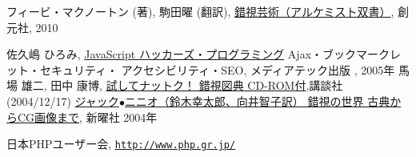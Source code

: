 \begin{thebibliography}{99}
 フィービ・マクノートン (著), 駒田曜 (翻訳),
				 \href{http://www.amazon.co.jp/%E9%8C%AF%E8%A6%96%E8%8A%B8%E8%A1%93%EF%BC%88%E3%82%A2%E3%83%AB%E3%82%B1%E3%83%9F%E3%82%B9%E3%83%88%E5%8F%8C%E6%9B%B8%EF%BC%89-%E3%83%95%E3%82%A3%E3%83%BC%E3%83%93%E3%83%BB%E3%83%9E%E3%82%AF%E3%83%8E%E3%83%BC%E3%83%88%E3%83%B3/dp/4422214802/ref=sr_1_42?s=books&ie=UTF8&qid=1457336858&sr=1-42&keywords=%E9%8C%AF%E8%A6%96}{錯視芸術（アルケミスト双書）},
				 創元社, 2010
\fi
\iffalse
 \bibitem{Ajax}深津 貴之、増井 雄一郎、川崎 有亮、台場 圭一、WINGSプロジェクト,\\
\href{http://www.amazon.co.jp/exec/obidos/ASIN/4774125792/qid=1149342810/sr=8-2/ref=sr_8_xs_ap_i2_xgl14/249-2928731-2660351}
{Ajax 実装のための基礎テクニック}、技術評論社、2006年
\fi
\ifSeminor
\else
 佐久嶋 ひろみ,
\href{http://www.amazon.co.jp/exec/obidos/search-handle-url/index=books-jp&field-keywords=javascript/ref=xs_ap_sai1_xgl14/249-2928731-2660351}{JavaScript
	ハッカーズ・プログラミング} Ajax・ブックマークレット・セキュリティ・
	アクセシビリティ・SEO, メディアテック出版 , 2005年
         \fi
馬場 雄二, 田中 康博,
\href{http://www.amazon.co.jp/%E8%A9%A6%E3%81%97%E3%81%A6%E3%83%8A%E3%83%83%E3%83%88%E3%82%AF%EF%BC%81-%E9%8C%AF%E8%A6%96%E5%9B%B3%E5%85%B8-CD-ROM%E4%BB%98-%E9%A6%AC%E5%A0%B4-%E9%9B%84%E4%BA%8C/dp/4062744082/sr=1-1/qid=1167376185/ref=sr_1_1/503-0729601-8062303?ie=UTF8&s=books}
{試してナットク！ 錯視図典 CD-ROM付},講談社 (2004/12/17)
\href{http://www.amazon.co.jp/錯覚の世界—古典からCG画像まで-ジャック-ニニオ/dp/4788508885/ref=sr_1_2?ie=UTF8&s=books&qid=1206947415&sr=8-2}{ジャック$\bullet$ニニオ（鈴木幸太郎、向井智子訳）
錯視の世界 古典からCG画像まで}, 新曜社 2004年
\iffalse
 \bibitem{HTML5Guide}羽田野 太巳, 白石 俊平, 古籏 一浩 , 太田 昌吾,\\
	 \href{http://www.amazon.co.jp/Google-API-Expert%E3%81%8C%E8%A7%A3%E8%AA%AC%E3%81%99%E3%82%8BHTML5%E3%82%AC%E3%82%A4%E3%83%89%E3%83%96%E3%83%83%E3%82%AF-%E7%BE%BD%E7%94%B0%E9%87%8E-%E5%A4%AA%E5%B7%B3/dp/4844329278/ref=pd_sim_b_2}
{Google API Expertが解説するHTML5ガイドブック}, インプレスジャパン, 2010
\fi
\iffalse
 \bibitem{HTML5SmartPhone}クジラ飛行机 ,
 \href{http://www.amazon.co.jp/%E3%82%B9%E3%83%9E%E3%83%BC%E3%83%88%E3%83%95%E3%82%A9%E3%83%B3%E3%81%AE%E3%81%9F%E3%82%81%E3%81%AEHTML5%E3%82%A2%E3%83%97%E3%83%AA%E3%82%B1%E3%83%BC%E3%82%B7%E3%83%A7%E3%83%B3%E9%96%8B%E7%99%BA%E3%82%AC%E3%82%A4%E3%83%89%E2%80%95iPhone-iPad-Android%E5%AF%BE%E5%BF%9C-%E3%82%AF%E3%82%B8%E3%83%A9%E9%A3%9B%E8%A1%8C%E6%9C%BA/dp/4883377288/ref=pd_sim_b_5}
{スマートフォンのためのHTML5アプリケーション開発ガイド
				 iPhone/iPad/Android対応 }, ソシム, 2010
\fi
\ifSeminor
\else
 日本PHPユーザー会,
				 \href{http://www.php.gr.jp/}{\texttt{http://www.php.gr.jp/}}
\fi
\iffalse
 \bibitem{AWK}A.V.エイホ , P.J.ワインバーガー , B.W.カーニハン ,
				 足立 高徳 (翻訳)
				プログラミング言語AWK, USP研究所, 2010
\fi
\end{thebibliography}

